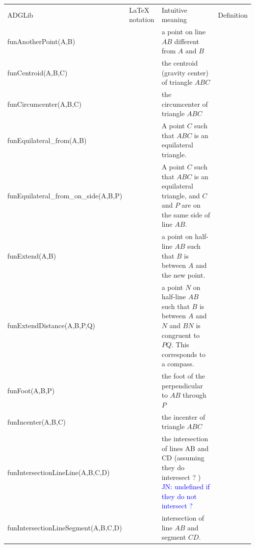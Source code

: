 \documentclass[a4wide,9pt,landscape]{article}
\newcommand{\jn}[1]{\textcolor{blue}{JN: #1}}
\begin{document}
\noindent\hspace{-75mm}
\begin{tabularx}{270mm}{>{\ttfamily}llXX}
\toprule
\multicolumn{4}{l}{\Huge Points-only; deterministic function symbols} \\ \midrule
ADGLib & 
\LaTeX{} notation & 
Intuitive meaning & 
Definition \\ \midrule
funAnotherPoint(A,B) & 
&
a point on line $AB$ different from $A$ and $B$ \\
funCentroid(A,B,C) & 
&
the centroid (gravity center) of triangle $ABC$ \\
funCircumcenter(A,B,C) & 
&
the circumcenter of triangle $ABC$ \\
funEquilateral\_from(A,B) & 
&
A point $C$ such that $ABC$ is an equilateral triangle. \\
funEquilateral\_from\_on\_side(A,B,P) & 
&
A point $C$ such that $ABC$ is an equilateral triangle, and $C$ and $P$ are on the same side of line $AB$. \\
funExtend(A,B) & &
a point on half-line $AB$ such that $B$ is between $A$ and the new point. \\
funExtendDistance(A,B,P,Q) & &
a point $N$ on half-line $AB$ such that $B$ is between $A$ and $N$ and $BN$ is congruent to $PQ$. This corresponds to a compass. \\
funFoot(A,B,P) & 
&
the foot of the perpendicular to $AB$ through $P$ \\
funIncenter(A,B,C) & 
&
the incenter of triangle $ABC$ \\
funIntersectionLineLine(A,B,C,D) & 
&
the intersection of lines AB and CD (assuming they do interesect ? ) \jn{undefined if they do not intersect ?}\\
funIntersectionLineSegment(A,B,C,D) & 
&
intersection of line $AB$ and segment $CD$. \\

\end{tabularx}
\end{document}
